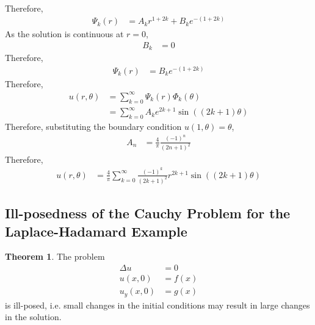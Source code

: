 \documentclass[titlepage, fleqn, a4paper, 12pt, twoside]{article}
\theoremstyle{definition}
\theoremstyle{theorem}
\newtheorem{theorem}{Theorem}
\begin{document}
\begin{solution}
\begin{align*}
	\end{align*}
	Therefore,
	\begin{align*}
		\Psi_k(r) & = A_k r^{1 + 2 k} + B_k e^{-(1 + 2 k)}
	\end{align*}
	As the solution is continuous at $r = 0$,
	\begin{align*}
		B_k & = 0
	\end{align*}
	Therefore,
	\begin{align*}
		\Psi_k(r) & = B_k e^{-(1 + 2 k)}
	\end{align*}
	Therefore,
	\begin{align*}
		u(r,\theta) & = \sum\limits_{k = 0}^{\infty} \Psi_k(r) \Phi_k(\theta) \\
                            & = \sum\limits_{k = 0}^{\infty} A_k e^{2 k + 1} \sin\left( (2 k + 1) \theta \right)
	\end{align*}
	Therefore, substituting the boundary condition $u(1,\theta) = \theta$,
	\begin{align*}
		A_n & = \frac{4}{\pi} \frac{(-1)^n}{(2 n + 1)^2}
	\end{align*}
	Therefore,
	\begin{align*}
		u(r,\theta) & = \frac{4}{\pi} \sum\limits_{k = 0}^{\infty} \frac{(-1)^k}{(2 k + 1)^2} r^{2 k + 1} \sin\left( (2 k + 1) \theta \right)
	\end{align*}
\end{solution}

\subsection{Ill-posedness of the Cauchy Problem for the Laplace-Hadamard Example}

\begin{theorem}
	The problem
	\begin{align*}
		\Delta u & = 0    \\
		u(x,0)   & = f(x) \\
		u_y(x,0) & = g(x)
	\end{align*}
	is ill-posed, i.e. small changes in the initial conditions may result in large changes in the solution.
\end{theorem}
\end{document}
